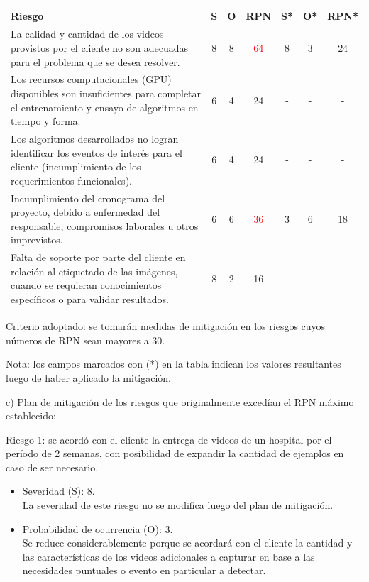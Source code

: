 \documentclass[
11pt, %
]{charter}
\begin{document}
\begin{table}[htpb]
	\centering
	\begin{tabularx}{\linewidth}{@{}|X|c|c|c|c|c|c|@{}}
		\hline
		\rowcolor[HTML]{C0C0C0} 
		Riesgo & S & O & RPN & S* & O* & RPN* \\ \hline
		La calidad y cantidad de los videos provistos por el cliente no son adecuadas para el problema que se desea resolver.    & 8  & 8  &    \textcolor{red}{64} &  8  &  3  &  24    \\ \hline
		Los recursos computacionales (GPU) disponibles son insuficientes para completar el entrenamiento y ensayo de algoritmos en tiempo y forma.   & 6  & 4  &  24   & -   &  -  &  -    \\ \hline
		Los algoritmos desarrollados no logran identificar los eventos de interés para el cliente (incumplimiento de los requerimientos funcionales).   & 6  &  4 &  24   & -   &  -  &   -   \\ \hline
		Incumplimiento del cronograma del proyecto, debido a enfermedad del responsable, compromisos laborales u otros imprevistos.     &  6 &   6 &  \textcolor{red}{36}   &  3  &  6  &  18    \\ \hline
		Falta de soporte por parte del cliente en relación al etiquetado de las imágenes, cuando se requieran conocimientos específicos o para validar resultados.    & 8   & 2  &   16  &  -  &  -  &   -   \\ \hline
	\end{tabularx}
\end{table}
\FloatBarrier

Criterio adoptado: 
se tomarán medidas de mitigación en los riesgos cuyos números de RPN sean mayores a 30.

Nota: los campos marcados con (*) en la tabla indican los valores resultantes luego de haber aplicado la mitigación.

c) Plan de mitigación de los riesgos que originalmente excedían el RPN máximo establecido:


Riesgo 1: se acordó con el cliente la entrega de videos de un hospital por el período de 2 semanas, con posibilidad de expandir la cantidad de ejemplos en caso de ser necesario.
\begin{itemize}
	\item Severidad (S): 8.\\
	La severidad de este riesgo no se modifica luego del plan de mitigación.
	\item Probabilidad de ocurrencia (O): 3.\\
	Se reduce considerablemente porque se acordará con el cliente la cantidad y las características de los videos adicionales a capturar en base a las necesidades puntuales o evento en particular a detectar.
\end{itemize}  
\end{document}
